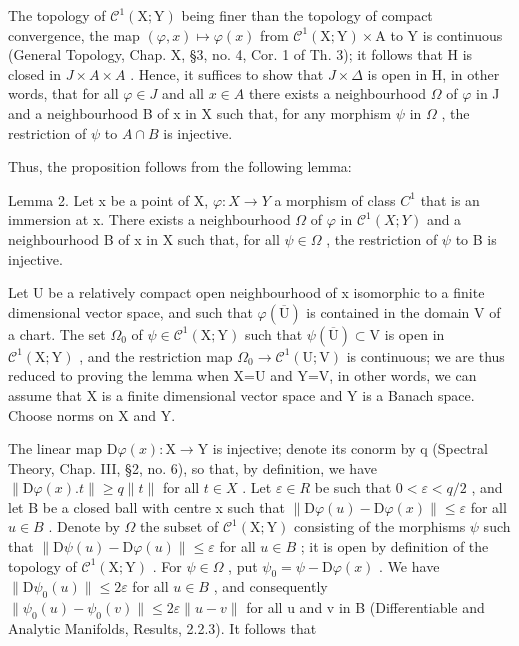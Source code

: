 The topology of \(\mathcal{C}^{1}(\mathrm{X};\mathrm{Y})\) being finer than the topology of compact convergence, the map \((\varphi,x)\mapsto\varphi(x)\) from \(\mathcal{C}^{1}(\mathrm{X};\mathrm{Y})\times\mathrm{A}\) to Y is continuous (General Topology, Chap. X, §3, no. 4, Cor. 1 of Th. 3); it follows that H is closed in \(J\times A\times A\) . Hence, it suffices to show that \(J\times\Delta\) is open in H, in other words, that for all \(\varphi\in J\) and all \(x\in A\) there exists a neighbourhood \(\Omega\) of \(\varphi\) in J and a neighbourhood B of x in X such that, for any morphism \(\psi\) in \(\Omega\) , the restriction of \(\psi\) to \(A\cap B\) is injective.

Thus, the proposition follows from the following lemma:

Lemma 2. Let x be a point of X, \(\varphi: X \to Y\) a morphism of class \(C^{1}\) that is an immersion at x. There exists a neighbourhood \(\Omega\) of \(\varphi\) in \(\mathcal{C}^{1}(X;Y)\) and a neighbourhood B of x in X such that, for all \(\psi \in \Omega\) , the restriction of \(\psi\) to B is injective.

Let U be a relatively compact open neighbourhood of x isomorphic to a finite dimensional vector space, and such that \(\varphi(\overline{\mathrm{U}})\) is contained in the domain V of a chart. The set \(\Omega_{0}\) of \(\psi\in\mathcal{C}^{1}(\mathrm{X};\mathrm{Y})\) such that \(\psi(\overline{\mathrm{U}})\subset\mathrm{V}\) is open in \(\mathcal{C}^{1}(\mathrm{X};\mathrm{Y})\) , and the restriction map \(\Omega_{0}\to\mathcal{C}^{1}(\mathrm{U};\mathrm{V})\) is continuous; we are thus reduced to proving the lemma when X=U and Y=V, in other words, we can assume that X is a finite dimensional vector space and Y is a Banach space. Choose norms on X and Y.

The linear map \(\mathrm{D}\varphi(x):\mathrm{X}\to\mathrm{Y}\) is injective; denote its conorm by q (Spectral Theory, Chap. III, §2, no. 6), so that, by definition, we have \(\|\mathrm{D}\varphi(x).t\|\geq q\|t\|\) for all \(t\in X\) . Let \(\varepsilon\in R\) be such that \(0<\varepsilon<q/2\) , and let B be a closed ball with centre x such that \(\|\mathrm{D}\varphi(u)-\mathrm{D}\varphi(x)\|\leq\varepsilon\) for all \(u\in B\) . Denote by \(\Omega\) the subset of \(\mathcal{C}^{1}(\mathrm{X};\mathrm{Y})\) consisting of the morphisms \(\psi\) such that \(\|\mathrm{D}\psi(u)-\mathrm{D}\varphi(u)\|\leq\varepsilon\) for all \(u\in B\) ; it is open by definition of the topology of \(\mathcal{C}^{1}(\mathrm{X};\mathrm{Y})\) . For \(\psi\in\Omega\) , put \(\psi_{0}=\psi-\mathrm{D}\varphi(x)\) . We have \(\|\mathrm{D}\psi_{0}(u)\|\leq2\varepsilon\) for all \(u\in B\) , and consequently \(\|\psi_{0}(u)-\psi_{0}(v)\|\leq2\varepsilon\|u-v\|\) for all u and v in B (Differentiable and Analytic Manifolds, Results, 2.2.3). It follows that

